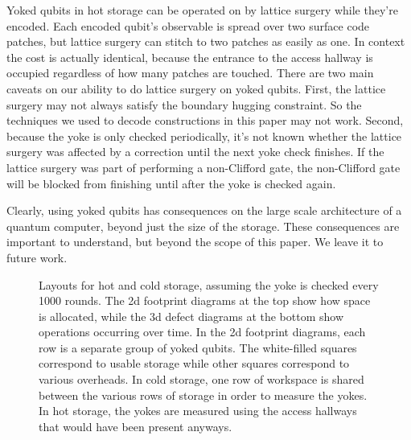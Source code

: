 \documentclass[onecolumn,unpublished,a4paper]{quantumarticle}
\theoremstyle{definition}
\theoremstyle{definition}
\theoremstyle{definition}
\begin{document}
Yoked qubits in hot storage can be operated on by lattice surgery while they're encoded.
Each encoded qubit's observable is spread over two surface code patches, but lattice surgery can stitch to two patches as easily as one.
In context the cost is actually identical, because the entrance to the access hallway is occupied regardless of how many patches are touched.
There are two main caveats on our ability to do lattice surgery on yoked qubits.
First, the lattice surgery may not always satisfy the boundary hugging constraint.
So the techniques we used to decode constructions in this paper may not work.
Second, because the yoke is only checked periodically, it's not known whether the lattice surgery was affected by a correction until the next yoke check finishes.
If the lattice surgery was part of performing a non-Clifford gate, the non-Clifford gate will be blocked from finishing until after the yoke is checked again.

Clearly, using yoked qubits has consequences on the large scale architecture of a quantum computer, beyond just the size of the storage.
These consequences are important to understand, but beyond the scope of this paper.
We leave it to future work.


\begin{figure}[h]
    \centering
    \caption{
        Layouts for hot and cold storage, assuming the yoke is checked every 1000 rounds.
        The 2d footprint diagrams at the top show how space is allocated, while the 3d defect diagrams at the bottom show operations occurring over time.
        In the 2d footprint diagrams, each row is a separate group of yoked qubits.
        The white-filled squares correspond to usable storage while other squares correspond to various overheads.
        In cold storage, one row of workspace is shared between the various rows of storage in order to measure the yokes.
        In hot storage, the yokes are measured using the access hallways that would have been present anyways.
    }
    \label{fig:storage}
\end{figure}
\end{document}
